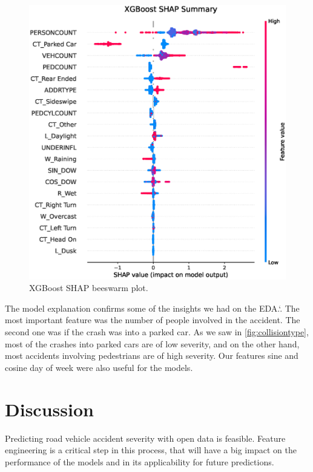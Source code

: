 \documentclass[12pt]{article}
\begin{document}
\begin{figure}
        \centering
        \includegraphics[width=\textwidth]{plot_shap_beeswarm.eps}
        \caption{XGBoost SHAP beeswarm plot.\label{fig:xgbshapbee}}
\end{figure}

\newpage

The model explanation confirms some of the insights we had on the EDA.\spacefactor\sfcode`.{} The most important feature was the number of people involved in the accident. The second one was if the crash was into a parked car. As we saw in \autoref{fig:collisiontype}, most of the crashes into parked cars are of low severity, and on the other hand, most accidents involving pedestrians are of high severity. Our features sine and cosine day of week were also useful for the models.

\section{Discussion}

Predicting road vehicle accident severity with open data is feasible. Feature engineering is a critical step in this process, that will have a big impact on the performance of the models and in its applicability for future predictions.
\end{document}
